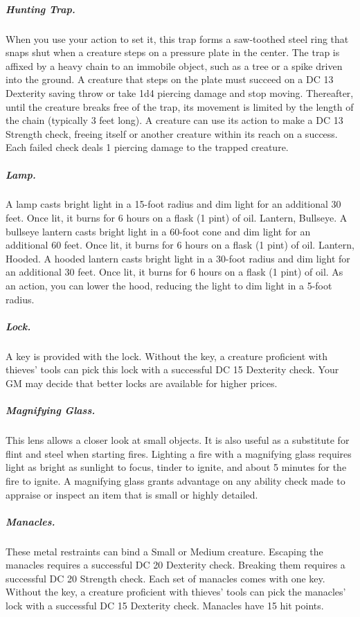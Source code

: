 \subparagraph*{Hunting Trap.} When you use your action to set it, this trap forms a saw-toothed steel ring that snaps shut when a creature steps on a pressure plate in the center. The trap is affixed by a heavy chain to an immobile object, such as a tree or a spike driven into the ground. A creature that steps on the plate must succeed on a DC 13 Dexterity saving throw or take 1d4 piercing damage and stop moving. Thereafter, until the creature breaks free of the trap, its movement is limited by the length of the chain (typically 3 feet long). A creature can use its action to make a DC 13 Strength check, freeing itself or another creature within its reach on a success. Each failed check deals 1 piercing damage to the trapped creature.

\subparagraph*{Lamp.} A lamp casts bright light in a 15-foot radius and dim light for an additional 30 feet. Once lit, it burns for 6 hours on a flask (1 pint) of oil.
Lantern, Bullseye. A bullseye lantern casts bright light in a 60-foot cone and dim light for an additional 60 feet. Once lit, it burns for 6 hours on a flask (1 pint) of oil.
Lantern, Hooded. A hooded lantern casts bright light in a 30-foot radius and dim light for an additional 30 feet. Once lit, it burns for 6 hours on a flask (1 pint) of oil. As an action, you can lower the hood, reducing the light to dim light in a 5-foot radius.

\subparagraph*{Lock.} A key is provided with the lock. Without the key, a creature proficient with thieves' tools can pick this lock with a successful DC 15 Dexterity check. Your GM may decide that better locks are available for higher prices.

\subparagraph*{Magnifying Glass.} This lens allows a closer look at small objects. It is also useful as a substitute for flint and steel when starting fires. Lighting a fire with a magnifying glass requires light as bright as sunlight to focus, tinder to ignite, and about 5 minutes for the fire to ignite. A magnifying glass grants advantage on any ability check made to appraise or inspect an item that is small or highly detailed.

\subparagraph*{Manacles.} These metal restraints can bind a Small or Medium creature. Escaping the manacles requires a successful DC 20 Dexterity check. Breaking them requires a successful DC 20 Strength check. Each set of manacles comes with one key. Without the key, a creature proficient with thieves' tools can pick the manacles' lock with a successful DC 15 Dexterity check. Manacles have 15 hit points.

